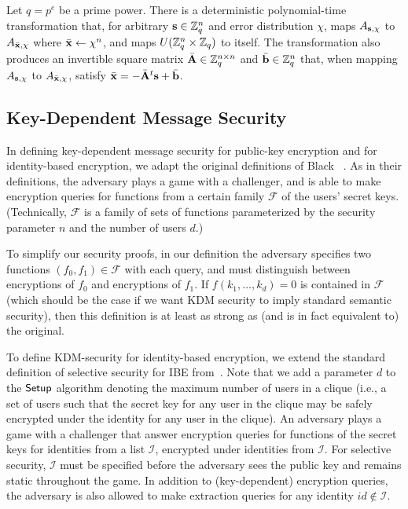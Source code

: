 \begin{lemma} \label{LWEtransformation}
  Let $q=p^{e}$ be a prime power. There is a deterministic
  polynomial-time transformation that, for arbitrary $\mathbf{s} \in
  \mathbb{Z}_q^n$ and error distribution $\chi$, maps $A_{\mathbf{s}, \chi}$ to
  $A_{\bar{\mathbf{x}}, \chi}$ where $\bar{\mathbf{x}} \gets \chi^n$, and maps
  $U(\mathbb{Z}_q^n \times \mathbb{Z}_q)$ to itself. The transformation also produces
  an invertible square matrix $\bar{\mathbf{A}} \in \mathbb{Z}_q^{n \times n}$ and
  $\bar{\mathbf{b}} \in \mathbb{Z}_q^n$ that, when mapping $A_{\mathbf{s}, \chi}$ to
  $A_{\bar{\mathbf{x}}, \chi}$, satisfy $\bar{\mathbf{x}} =
  -\bar{\mathbf{A}}^{t}\mathbf{s}+\bar{\mathbf{b}}$.
\end{lemma}

\iflncs
\subsection{Key-Dependent Message Security}
\label{subsec:KDM}

In defining key-dependent message security  for
public-key encryption and for identity-based encryption, we adapt the
original definitions of Black
\etal~\cite{DBLP:conf/sacrypt/BlackRS02}. As in their definitions, the adversary 
plays a game with a challenger, and is able
to make encryption queries for functions from a certain family $\mathcal{F}$ of the 
users' secret
keys. (Technically, $\mathcal{F}$ is a family of sets of functions
parameterized by the security parameter $n$ and the number of users
$d$.)  

To simplify our security proofs, in our definition the adversary
specifies two functions $(f_0, f_1) \in \mathcal{F}$ with each query,
and must distinguish between encryptions of $f_0$ and encryptions of
$f_1$. If $f(k_1, \ldots, k_d)=0$ is contained in $\mathcal{F}$ (which
should be the case if we want KDM security to imply standard semantic
security), then this definition is at least as
strong as (and is in fact equivalent to) the original.

To define KDM-security for identity-based encryption, we extend the 
standard
definition of selective security for IBE
from~\cite{DBLP:journals/joc/CanettiHK07,
  DBLP:journals/siamcomp/BonehCHK07}. Note that we 
add a parameter $d$ to the $\mathsf{Setup}$ algorithm denoting the maximum 
number of users in a clique (i.e., a set of users such that the secret key for 
any user in the clique may be safely encrypted under the identity for any 
user in the clique).
  An adversary plays a game with a
challenger that answer encryption queries for functions of the secret
keys for identities from a list $\mathcal{I}$, encrypted under
identities from $\mathcal{I}$. For selective security, $\mathcal{I}$
must be specified before the adversary sees the public key and remains
static throughout the game. In addition to (key-dependent) encryption
queries, the adversary is also allowed to make extraction queries for
any identity $id \notin \mathcal{I}$.

